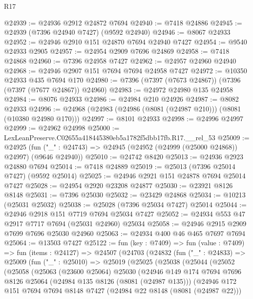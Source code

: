 \begin{lexlean}{R17}
\begin{coremodule}
@24939 := @24936 @2912 @24872 @7694
@24940 := @7418 @24886
@24945 := @24939 (@7396 @24940 @7427) (@9592 @24940)
@24946 := @8067 @24933
@24952 := @24946 @2910 @151 @24870 @7694 @24940 @7427
@24954 := @9540 @24933 @2905
@24957 := @24954 @2909 @7696 @24869
@24958 := @7418 @24868
@24960 := @7396 @24958 @7427
@24962 := @24957 @24960 @24940
@24968 := @24946 @2907 @151 @7694 @7694 @24958 @7427
@24972 := @10350 @24933 @435 @7694 @170
@24980 := @7396 (@7397 (@7673 @24867)) (@7396 (@7397 (@7677 @24867)) @24960)
@24983 := @24972 @24980 @135 @24958
@24984 := @8076 @24933
@24986 := @24984 @210 @24926
@24987 := @8082 @24933
@24996 := @24968 (@24983 (@24986 (@8081 (@24987 @210))) (@8081 (@10380 @24980 @170)))
@24997 := @8101 @24933
@24998 := @24996 @24997
@24999 := @24962 @24998
@25000 := LexLeanPreserve.C02655a418445380eb5a1782f5dbb17fb.R17.__rel_53
@25009 := @24925
    (fun ("_" : @24743) => @24945 (@24952 (@24999 (@25000 @24868)) @24997) (@9646 @24940))
@25010 := @24742 @8420
@25013 := @24936 @2923 @24880 @7694
@25014 := @7418 @24889
@25019 := @25013 (@7396 @25014 @7427) (@9592 @25014)
@25025 := @24946 @2921 @151 @24878 @7694 @25014 @7427
@25028 := @24954 @2920 @23208 @24877
@25030 := @23921 @8126 @8148
@25031 := @7396 @25030
@25032 := @23429 @24868
@25034 := @10213 (@25031 @25032)
@25038 := @25028 (@7396 @25034 @7427) @25014
@25044 := @24946 @2918 @151 @7719 @7694 @25034 @7427
@25052 := @24934 @553 @47 @2917 @7717 @7694 (@25031 @24960) @25034
@25058 := @24946 @2915 @2909 @7699 @7696 @25030 @24960
@25063 := @24934 @400 @46 @465 @7697 @7694
@25064 := @13503 @7427
@25122 := fun (key : @7409) =>
  fun (value : @7409) =>
  fun (items : @24127) =>
  @24507
    (@24703
      (@24832
        (fun ("_" : @24833) =>
        @25009
          (fun ("_" : @25010) =>
          @25019
            (@25025
              (@25038
                (@25044
                  (@25052
                    (@25058
                      (@25063
                        (@23600 @25064)
                        @25030
                        (@24946
                          @149
                          @174
                          @7694
                          @7696
                          @8126
                          @25064
                          (@24984 @135 @8126 (@8081 (@24987 @135)))
                          (@24946
                            @172
                            @151
                            @7694
                            @7694
                            @8148
                            @7427
                            (@24984 @22 @8148 (@8081 (@24987 @22)))

\end{coremodule}
\end{lexlean}
